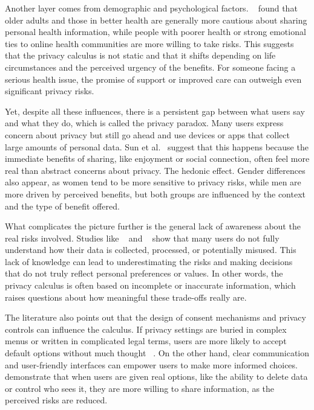 	Another layer comes from demographic and psychological factors. ~\cite{Kordzadeh2016} found that older adults and those in better health are generally more cautious about sharing personal health information, while people with poorer health or strong emotional ties to online health communities are more willing to take risks. This suggests that the privacy calculus is not static and that it shifts depending on life circumstances and the perceived urgency of the benefits. For someone facing a serious health issue, the promise of support or improved care can outweigh even significant privacy risks.

	Yet, despite all these influences, there is a persistent gap between what users say and what they do, which is called the privacy paradox. Many users express concern about privacy but still go ahead and use devices or apps that collect large amounts of personal data. Sun et al.~\cite{Sun2015} suggest that this happens because the immediate benefits of sharing, like enjoyment or social connection, often feel more real than abstract concerns about privacy. The hedonic effect. Gender differences also appear, as women tend to be more sensitive to privacy risks, while men are more driven by perceived benefits, but both groups are influenced by the context and the type of benefit offered.

	What complicates the picture further is the general lack of awareness about the real risks involved. Studies like ~\cite{Cilliers2019} and ~\cite{Datta2018} show that many users do not fully understand how their data is collected, processed, or potentially misused. This lack of knowledge can lead to underestimating the risks and making decisions that do not truly reflect personal preferences or values. In other words, the privacy calculus is often based on incomplete or inaccurate information, which raises questions about how meaningful these trade-offs really are.

	The literature also points out that the design of consent mechanisms and privacy controls can influence the calculus. If privacy settings are buried in complex menus or written in complicated legal terms, users are more likely to accept default options without much thought ~\cite{Banerjee2018}. On the other hand, clear communication and user-friendly interfaces can empower users to make more informed choices. ~\cite{Gupta2023} demonstrate that when users are given real options, like the ability to delete data or control who sees it, they are more willing to share information, as the perceived risks are reduced.

